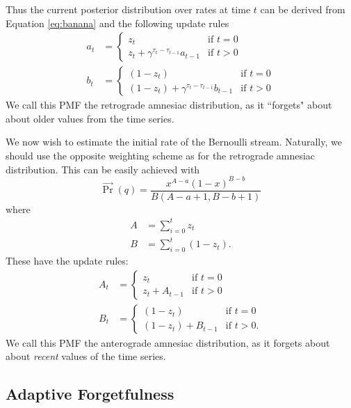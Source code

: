 Thus the current posterior distribution over rates at time $t$ can be derived from Equation \ref{eq:banana} and the following update rules
\begin{align}
    a_t &= \begin{cases} 
        z_t & \text{if $t=0$} \\ 
        z_t + \gamma^{\tau_t-\tau_{t-1}} a_{t-1} & \text{if $t>0$} 
    \end{cases} \\
    b_t &= \begin{cases} 
        (1-z_t) & \text{if $t=0$} \\ 
        (1-z_t) + \gamma^{\tau_t-\tau_{t-1}} b_{t-1} & \text{if $t>0$} 
    \end{cases}
\end{align}
We call this PMF the retrograde amnesiac distribution, as it ``forgets" about about older values from the time series.

We now wish to estimate the initial rate of the Bernoulli stream. Naturally, we should use the opposite weighting scheme as for the retrograde amnesiac distribution. This can be easily achieved with
\begin{equation}
    \overrightarrow{\Pr}(q) = \frac{x^{A-a} (1-x)^{B-b}}{B(A-a+1,B-b+1)} \label{eq:banana_two}
\end{equation}
where
\begin{align}
    A &= \sum_{i=0}^t z_t \\
    B &= \sum_{i=0}^t (1-z_t).
\end{align}
These have the update rules:
\begin{align}
    A_t &= \begin{cases} 
        z_t & \text{if $t=0$} \\ 
        z_t + A_{t-1} & \text{if $t>0$} 
    \end{cases} \\
    B_t &= \begin{cases} 
        (1-z_t) & \text{if $t=0$} \\ 
        (1-z_t) + B_{t-1} & \text{if $t>0$} .
    \end{cases}
\end{align}
We call this PMF the anterograde amnesiac distribution, as it forgets about about {\it recent} values of the time series.

\subsection{Adaptive Forgetfulness}

